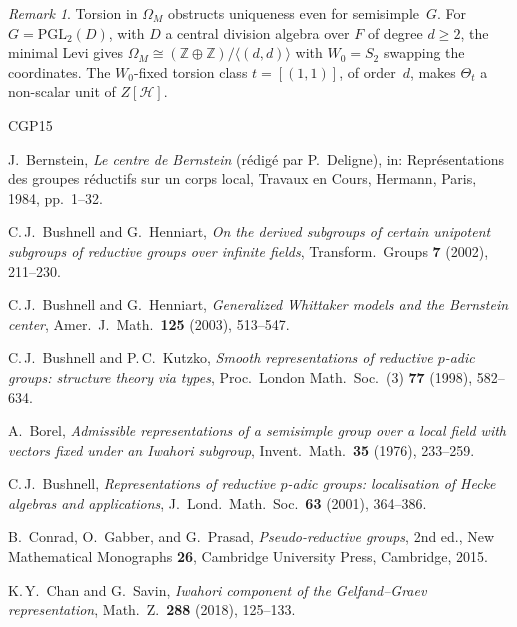 \documentclass[11pt]{amsart}
\theoremstyle{definition}
\theoremstyle{remark}
\newtheorem{remark}[theorem]{Remark}
\newcommand{\ZZ}{\mathbb{Z}}
\newcommand{\HH}{\mathcal{H}}
\begin{document}
\begin{remark}\label{rem:PGL2D}
Torsion in $\Omega_M$ obstructs uniqueness even for semisimple~$G$. For $G = \mathrm{PGL}_2(D)$, with $D$ a central division algebra over $F$ of degree $d \ge 2$, the minimal Levi gives $\Omega_M \cong (\ZZ\oplus\ZZ)/\langle(d,d)\rangle$ with $W_0 = S_2$ swapping the coordinates. The $W_0$-fixed torsion class $t = [(1,1)]$, of order~$d$, makes $\Theta_t$ a non-scalar unit of $Z[\HH]$.
\end{remark}



\begin{thebibliography}{CGP15}

 J.~Bernstein, \emph{Le centre de Bernstein} (r\'edig\'e par P.~Deligne), in: Repr\'esentations des groupes r\'eductifs sur un corps local, Travaux en Cours, Hermann, Paris, 1984, pp.~1--32.

 C.\,J.~Bushnell and G.~Henniart, \emph{On the derived subgroups of certain unipotent subgroups of reductive groups over infinite fields}, Transform.\ Groups \textbf{7} (2002), 211--230.

 C.\,J.~Bushnell and G.~Henniart, \emph{Generalized Whittaker models and the Bernstein center}, Amer.\ J.\ Math.\ \textbf{125} (2003), 513--547.

 C.\,J.~Bushnell and P.\,C.~Kutzko, \emph{Smooth representations of reductive $p$-adic groups: structure theory via types}, Proc.\ London Math.\ Soc.\ (3) \textbf{77} (1998), 582--634.

 A.~Borel, \emph{Admissible representations of a semisimple group over a local field with vectors fixed under an Iwahori subgroup}, Invent.\ Math.\ \textbf{35} (1976), 233--259.


 C.\,J.~Bushnell, \emph{Representations of reductive $p$-adic groups: localisation of Hecke algebras and applications}, J.~Lond.\ Math.\ Soc.\ \textbf{63} (2001), 364--386.

 B.~Conrad, O.~Gabber, and G.~Prasad, \emph{Pseudo-reductive groups}, 2nd ed., New Mathematical Monographs \textbf{26}, Cambridge University Press, Cambridge, 2015.

 K.\,Y.~Chan and G.~Savin, \emph{Iwahori component of the Gelfand--Graev representation}, Math.\ Z.\ \textbf{288} (2018), 125--133.


\end{thebibliography}
\end{document}
